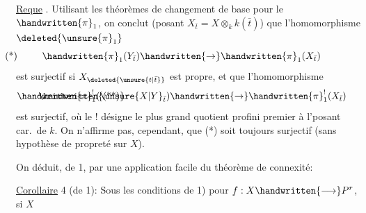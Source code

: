 \uline{Reque} . Utilisant les théorèmes de changement de base pour le $\handwritten{\pi}_1$, on conclut  (posant $X_{\bar{t}}=X\otimes_k k(\bar{t})$) que l'homomorphisme $\deleted{\unsure{\pi}_1}$
\[
\handwritten{\pi}_1(Y_{\bar{t}})\handwritten{\rightarrow}\handwritten{\pi}_1(X_{\bar{t}})\tag*{\makebox[0pt][l]{\hspace*{-\linewidth}(*)}}
\]
est surjectif si $X_{\deleted{\unsure{t|\bar{t}}}}$ est propre, et que l'homomorphisme
\[
\handwritten{\pi}_1^{!}(\unsure{X|Y}_{\bar{t}})\handwritten{\rightarrow}\handwritten{\pi}_1^{!}(X_{\bar{t}})\tag*{\makebox[0pt][l]{\hspace*{-\linewidth}\handwritten{(**)}}}
\]
est surjectif, où le ! désigne le plus grand quotient profini premier à l'posant car.\ de $k$. On n'affirme pas, cependant, que (*) soit toujours surjectif (sans hypothèse de propreté sur $X$).

On déduit, de 1, par une application facile du théorème de connexité:

\uline{Corollaire} 4 (de 1): Sous les conditions de 1) pour $f:X\handwritten{\longrightarrow}P^r$, si $X$

